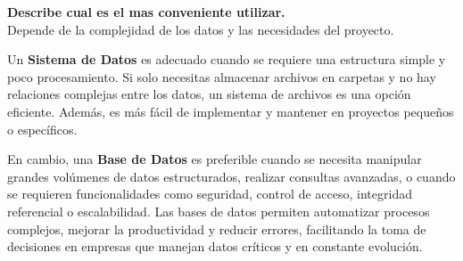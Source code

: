 \begin{center}
    \textbf{Describe cual es el mas conveniente utilizar.}\\
    Depende de la complejidad de los datos y las necesidades del proyecto.

Un \textbf{Sistema de Datos} es adecuado cuando se requiere una estructura simple y poco procesamiento. Si solo necesitas almacenar archivos en carpetas y no hay relaciones complejas entre los datos, un sistema de archivos es una opción eficiente. Además, es más fácil de implementar y mantener en proyectos pequeños o específicos.

En cambio, una \textbf{Base de Datos} es preferible cuando se necesita manipular grandes volúmenes de datos estructurados, realizar consultas avanzadas, o cuando se requieren funcionalidades como seguridad, control de acceso, integridad referencial o escalabilidad. Las bases de datos permiten automatizar procesos complejos, mejorar la productividad y reducir errores, facilitando la toma de decisiones en empresas que manejan datos críticos y en constante evolución.\\
\cite{sooluciona}
\end{center}
